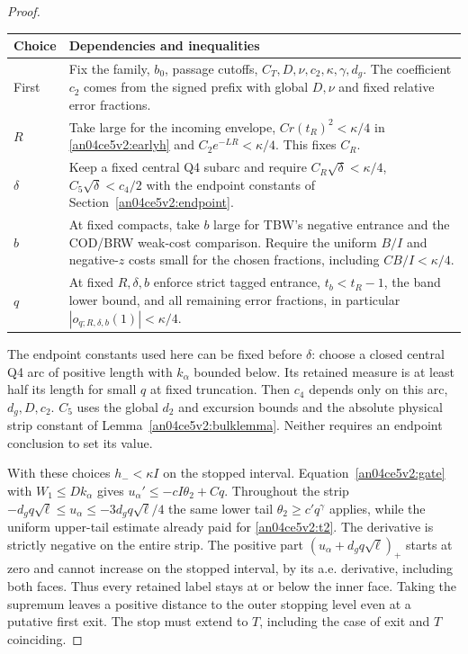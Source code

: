 \documentclass[11pt]{article}
\begin{document}
\begin{proof}
\begin{center}\small
\begin{tabular}{p{.14\linewidth}p{.76\linewidth}}
Choice & Dependencies and inequalities\\ \hline
First & Fix the family, $b_0$, passage cutoffs, $C_T,D,\nu,c_2,\kappa,\gamma,d_g$. The coefficient $c_2$ comes from the signed prefix with global $D,\nu$ and fixed relative error fractions.\\
$R$ & Take large for the incoming envelope, $Cr(t_R)^2<\kappa/4$ in \eqref{an04ce5v2:earlyh} and $C_2e^{-LR}<\kappa/4$. This fixes $C_R$.\\
$\delta$ & Keep a fixed central Q4 subarc and require $C_R\sqrt\delta<\kappa/4$, $C_5\sqrt\delta<c_4/2$ with the endpoint constants of Section~\ref{an04ce5v2:endpoint}.\\
$b$ & At fixed compacts, take $b$ large for TBW's negative entrance and the COD/BRW weak-cost comparison. Require the uniform $B/I$ and negative-$z$ costs small for the chosen fractions, including $CB/I<\kappa/4$.\\
$q$ & At fixed $R,\delta,b$ enforce strict tagged entrance, $t_b<t_R-1$, the band lower bound, and all remaining error fractions, in particular $|o_{q;R,\delta,b}(1)|<\kappa/4$.\\
\end{tabular}
\end{center}
The endpoint constants used here can be fixed before $\delta$: choose a closed central Q4 arc of positive length with $k_\alpha$ bounded below. Its retained measure is at least half its length for small $q$ at fixed truncation. Then $c_4$ depends only on this arc, $d_g,D,c_2$. $C_5$ uses the global $d_2$ and excursion bounds and the absolute physical strip constant of Lemma~\ref{an04ce5v2:bulklemma}. Neither requires an endpoint conclusion to set its value.

With these choices $h_-<\kappa I$ on the stopped interval. Equation~\eqref{an04ce5v2:gate} with $W_1\le Dk_\alpha$ gives $u_\alpha'\le-c I\theta_2+Cq$. Throughout the strip $-d_g q\sqrt\ell\le u_\alpha\le-3d_g q\sqrt\ell/4$ the same lower tail $\theta_2\ge c' q^\gamma$ applies, while the uniform upper-tail estimate already paid for \eqref{an04ce5v2:t2}. The derivative is strictly negative on the entire strip. The positive part $(u_\alpha+d_g q\sqrt\ell)_+$ starts at zero and cannot increase on the stopped interval, by its a.e. derivative, including both faces. Thus every retained label stays at or below the inner face. Taking the supremum leaves a positive distance to the outer stopping level even at a putative first exit. The stop must extend to $T$, including the case of exit and $T$ coinciding.
\end{proof}
\end{document}
